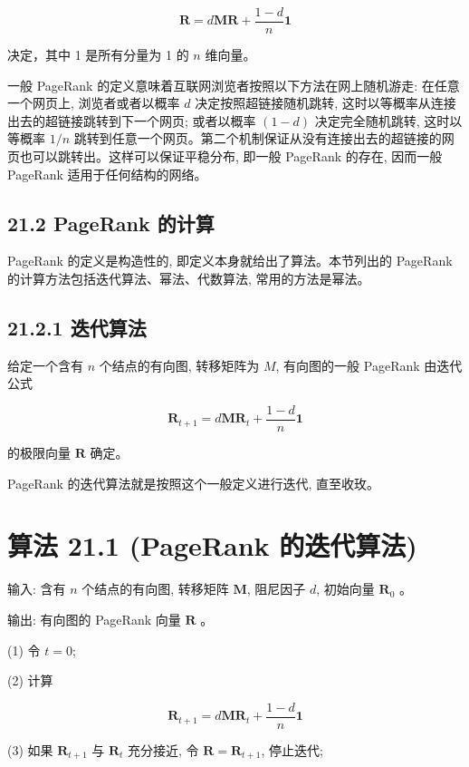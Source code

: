\documentclass[10pt]{article}
\begin{document}
\begin{CJK*}{UTF8}{bsmi}
\begin{equation*}
\boldsymbol{R}=d \boldsymbol{M} \boldsymbol{R}+\frac{1-d}{n} \mathbf{1} \tag{21.14}
\end{equation*}


决定，其中 1 是所有分量为 1 的 $n$ 维向量。

一般 PageRank 的定义意味着互联网浏览者按照以下方法在网上随机游走: 在任意一个网页上, 浏览者或者以概率 $d$ 决定按照超链接随机跳转, 这时以等概率从连接出去的超链接跳转到下一个网页; 或者以概率 $(1-d)$ 决定完全随机跳转, 这时以等概率 $1 / n$ 跳转到任意一个网页。第二个机制保证从没有连接出去的超链接的网页也可以跳转出。这样可以保证平稳分布, 即一般 PageRank 的存在, 因而一般 PageRank 适用于任何结构的网络。

\subsection*{21.2 PageRank 的计算}
PageRank 的定义是构造性的, 即定义本身就给出了算法。本节列出的 PageRank 的计算方法包括迭代算法、幂法、代数算法, 常用的方法是幂法。

\subsection*{21.2.1 迭代算法}
给定一个含有 $n$ 个结点的有向图, 转移矩阵为 $M$, 有向图的一般 PageRank 由迭代公式


\begin{equation*}
\boldsymbol{R}_{t+1}=d \boldsymbol{M} \boldsymbol{R}_{t}+\frac{1-d}{n} \boldsymbol{1} \tag{21.15}
\end{equation*}


的极限向量 $\boldsymbol{R}$ 确定。

PageRank 的迭代算法就是按照这个一般定义进行迭代, 直至收玫。

\section*{算法 21.1 (PageRank 的迭代算法)}
输入: 含有 $n$ 个结点的有向图, 转移矩阵 $\boldsymbol{M}$, 阻尼因子 $d$, 初始向量 $\boldsymbol{R}_{0}$ 。

输出: 有向图的 PageRank 向量 $\boldsymbol{R}$ 。

(1) 令 $t=0$;

(2) 计算

$$
\boldsymbol{R}_{t+1}=d \boldsymbol{M} \boldsymbol{R}_{t}+\frac{1-d}{n} \boldsymbol{1}
$$

(3) 如果 $\boldsymbol{R}_{t+1}$ 与 $\boldsymbol{R}_{t}$ 充分接近, 令 $\boldsymbol{R}=\boldsymbol{R}_{t+1}$, 停止迭代;


\end{CJK*}
\end{document}
